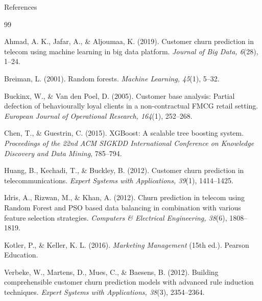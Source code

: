 \documentclass[10pt]{beamer}
\begin{document}
\begin{frame}{References}
	
	\tiny
	
	\begin{thebibliography}{99}
		
		\bibitem{}
		Ahmad, A. K., Jafar, A., \& Aljoumaa, K. (2019). Customer churn prediction in telecom using machine learning in big data platform. \textit{Journal of Big Data, 6}(28), 1--24.
		
		\vspace{0.15cm}
		
		\bibitem{}
		Breiman, L. (2001). Random forests. \textit{Machine Learning, 45}(1), 5--32.
		
		\vspace{0.15cm}
		
		\bibitem{}
		Buckinx, W., \& Van den Poel, D. (2005). Customer base analysis: Partial defection of behaviourally loyal clients in a non-contractual FMCG retail setting. \textit{European Journal of Operational Research, 164}(1), 252--268.
		
		\vspace{0.15cm}
		
		\bibitem{}
		Chen, T., \& Guestrin, C. (2015). XGBoost: A scalable tree boosting system. \textit{Proceedings of the 22nd ACM SIGKDD International Conference on Knowledge Discovery and Data Mining}, 785--794.
		
		\vspace{0.15cm}
		
		\bibitem{}
		Huang, B., Kechadi, T., \& Buckley, B. (2012). Customer churn prediction in telecommunications. \textit{Expert Systems with Applications, 39}(1), 1414--1425.
		
		\vspace{0.15cm}
		
		\bibitem{}
		Idris, A., Rizwan, M., \& Khan, A. (2012). Churn prediction in telecom using Random Forest and PSO based data balancing in combination with various feature selection strategies. \textit{Computers \& Electrical Engineering, 38}(6), 1808--1819.
		
		\vspace{0.15cm}
		
		\bibitem{}
		Kotler, P., \& Keller, K. L. (2016). \textit{Marketing Management} (15th ed.). Pearson Education.
		
		\vspace{0.15cm}
		
		\bibitem{}
		Verbeke, W., Martens, D., Mues, C., \& Baesens, B. (2012). Building comprehensible customer churn prediction models with advanced rule induction techniques. \textit{Expert Systems with Applications, 38}(3), 2354--2364.
		
	\end{thebibliography}
	
\end{frame}



	
	
\end{document}
